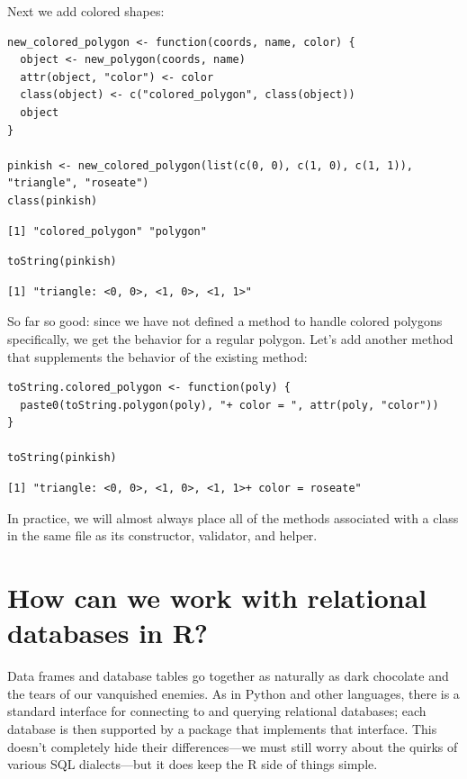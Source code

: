 \noindent
Next we add colored shapes:

\begin{lstlisting}
new_colored_polygon <- function(coords, name, color) {
  object <- new_polygon(coords, name)
  attr(object, "color") <- color
  class(object) <- c("colored_polygon", class(object))
  object
}

pinkish <- new_colored_polygon(list(c(0, 0), c(1, 0), c(1, 1)), "triangle", "roseate")
class(pinkish)
\end{lstlisting}

\begin{lstlisting}
[1] "colored_polygon" "polygon"        
\end{lstlisting}

\begin{lstlisting}
toString(pinkish)
\end{lstlisting}

\begin{lstlisting}
[1] "triangle: <0, 0>, <1, 0>, <1, 1>"
\end{lstlisting}

So far so good:
since we have not defined a method to handle colored polygons specifically,
we get the behavior for a regular polygon.
Let's add another method that supplements the behavior of the existing method:

\begin{lstlisting}
toString.colored_polygon <- function(poly) {
  paste0(toString.polygon(poly), "+ color = ", attr(poly, "color"))
}

toString(pinkish)
\end{lstlisting}

\begin{lstlisting}
[1] "triangle: <0, 0>, <1, 0>, <1, 1>+ color = roseate"
\end{lstlisting}

In practice,
we will almost always place all of the methods associated with a class
in the same file as its constructor, validator, and helper.

\section{How can we work with relational databases in R?}\label{advanced-db}

Data frames and database tables go together
as naturally as dark chocolate and the tears of our vanquished enemies.
As in Python and other languages,
there is a standard interface for connecting to and querying relational databases;
each database is then supported by a package that implements that interface.
This doesn't completely hide their differences---we must still worry about
the quirks of various SQL dialects---but it does keep the R side of things simple.

